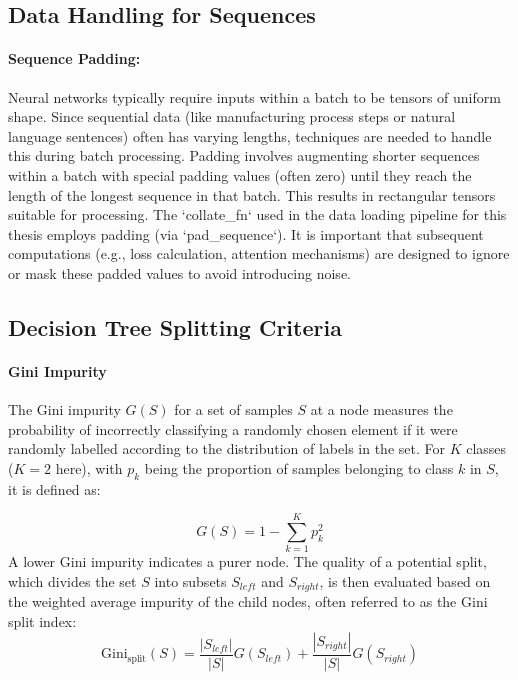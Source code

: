 \begin{appendices}
  \subsection{Data Handling for Sequences}

  \paragraph{Sequence Padding:}
  Neural networks typically require inputs within a batch to be tensors of uniform shape. Since sequential data (like manufacturing process steps or natural language sentences) often has varying lengths, techniques are needed to handle this during batch processing. Padding involves augmenting shorter sequences within a batch with special padding values (often zero) until they reach the length of the longest sequence in that batch. This results in rectangular tensors suitable for processing. The `collate\_fn` used in the data loading pipeline for this thesis employs padding (via `pad\_sequence`). It is important that subsequent computations (e.g., loss calculation, attention mechanisms) are designed to ignore or mask these padded values to avoid introducing noise.

  \subsection{Decision Tree Splitting Criteria}
  \label{subsec:decision_tree_splitting_criteria}

  \paragraph{Gini Impurity}
  The Gini impurity $G(S)$ for a set of samples $S$ at a node measures the probability of incorrectly classifying a randomly chosen element if it were randomly labelled according to the distribution of labels in the set. For $K$ classes ($K = 2$ here), with $p_k$ being the proportion of samples belonging to class $k$ in $S$, it is defined as:

  \begin{equation}
    G(S) = 1 - \sum_{k=1}^{K} p_k^2
    \label{eq:gini_impurity}
  \end{equation}
  A lower Gini impurity indicates a purer node. The quality of a potential split, which divides the set $S$ into subsets $S_{left}$ and $S_{right}$, is then evaluated based on the weighted average impurity of the child nodes, often referred to as the Gini split index:
  \begin{equation}
    \text{Gini}_{\text{split}}(S) = \frac{|S_{left}|}{|S|} G(S_{left}) + \frac{|S_{right}|}{|S|} G(S_{right})
    \label{eq:gini_split}
  \end{equation}


\end{appendices}
